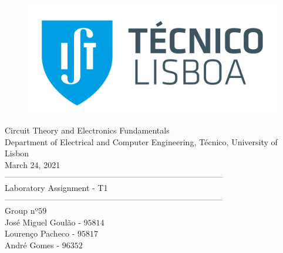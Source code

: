 \thispagestyle {empty}


\begin{figure}[h]
	\centering
	\includegraphics[width = 0.5\linewidth]{ist_foto}
\end{figure}


\begin{center}

\vspace{2cm}
{\FontLb Circuit Theory and Electronics Fundamentals} \\

\vspace{0.5cm}
{\FontSn Department of Electrical and Computer Engineering, Técnico, University of Lisbon} \\

\vspace{0.5cm}
{\FontSn March 24, 2021} \\

\vspace{1cm}
{\FontSn --------------------------------------------------------------------------------} \\
\vspace{0.1cm}
{\FontLb Laboratory Assignment - T1} \\
{\FontSn --------------------------------------------------------------------------------} \\

\vspace{1cm}
{\FontSn Group nº$59$} \\
\vspace{0.25cm}
{\FontSn José Miguel Goulão - $95814$} \\
{\FontSn Lourenço Pacheco - $95817$} \\
{\FontSn André Gomes - $96352$} \\

\vspace{1cm}

\end{center}


